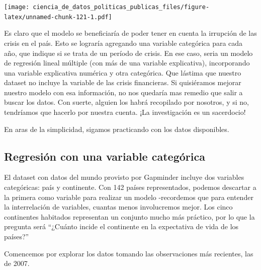 \documentclass[]{book}
\newenvironment{Shaded}{\begin{snugshade}}{\end{snugshade}}
\newcommand{\KeywordTok}[1]{\textcolor[rgb]{0.13,0.29,0.53}{\textbf{#1}}}
\newcommand{\DataTypeTok}[1]{\textcolor[rgb]{0.13,0.29,0.53}{#1}}
\newcommand{\DecValTok}[1]{\textcolor[rgb]{0.00,0.00,0.81}{#1}}
\newcommand{\StringTok}[1]{\textcolor[rgb]{0.31,0.60,0.02}{#1}}
\newcommand{\OperatorTok}[1]{\textcolor[rgb]{0.81,0.36,0.00}{\textbf{#1}}}
\newcommand{\NormalTok}[1]{#1}
\begin{document}
\texttt{[image: ciencia\_de\_datos\_politicas\_publicas\_files/figure-latex/unnamed-chunk-121-1.pdf]}

Es claro que el modelo se beneficiaría de poder tener en cuenta la
irrupción de las crisis en el país. Esto se lograría agregando una
variable categórica para cada año, que indique si se trata de un período
de crisis. En ese caso, seria un modelo de regresión lineal múltiple
(con más de una variable explicativa), incorporando una variable
explicativa numérica y otra categórica. Que lástima que nuestro dataset
no incluye la variable de las crisis financieras. Si quisiéramos mejorar
nuestro modelo con esa información, no nos quedaría mas remedio que
salir a buscar los datos. Con suerte, alguien los habrá recopilado por
nosotros, y si no, tendríamos que hacerlo por nuestra cuenta. ¡La
investigación es un sacerdocio!

En aras de la simplicidad, sigamos practicando con los datos
disponibles.

\subsection{Regresión con una variable
categórica}\label{regresion-con-una-variable-categorica}

El dataset con datos del mundo provisto por Gapminder incluye dos
variables categóricas: país y continente. Con 142 países representados,
podemos descartar a la primera como variable para realizar un modelo
-recordemos que para entender la interrelación de variables, cuantas
menos involucremos mejor. Los cinco continentes habitados representan un
conjunto mucho más práctico, por lo que la pregunta será ``¿Cuánto
incide el continente en la expectativa de vida de los países?''

Comencemos por explorar los datos tomando las observaciones más
recientes, las de 2007.

\begin{Shaded}
\end{Shaded}
\end{document}
